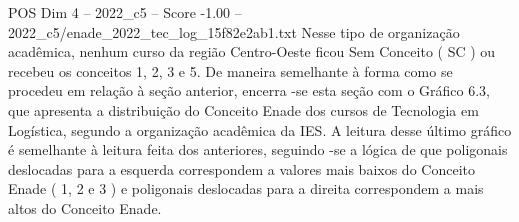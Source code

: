 \begin{textsample}{POS Dim 4 – 2022\_c5 – Score -1.00 – 2022\_c5/enade\_2022\_tec\_log\_15f82e2ab1.txt}
Nesse tipo de organização acadêmica, nenhum curso da região Centro-Oeste ficou Sem Conceito ( SC ) ou recebeu os conceitos 1, 2, 3 e 5.
De maneira semelhante à forma como se procedeu em relação à seção anterior, encerra -se esta seção com o Gráfico 6.3, que apresenta a distribuição do Conceito Enade dos cursos de Tecnologia em Logística, segundo a organização acadêmica da IES.
A leitura desse último gráfico é semelhante à leitura feita dos anteriores, seguindo -se a lógica de que poligonais deslocadas para a esquerda correspondem a valores mais baixos do Conceito Enade ( 1, 2 e 3 ) e poligonais deslocadas para a direita correspondem a mais altos do Conceito Enade.

\end{textsample}

